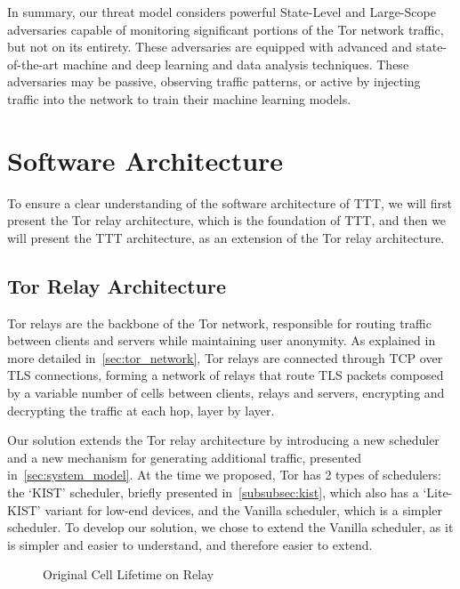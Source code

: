 In summary, our threat model considers powerful State-Level and Large-Scope adversaries capable of monitoring significant portions of the Tor network traffic, but not on its entirety. These adversaries are equipped with advanced and state-of-the-art machine and deep learning and data analysis techniques. These adversaries may be passive, observing traffic patterns, or active by injecting traffic into the network to train their machine learning models. 


\section{Software Architecture}\label{sec:software_architecture}

To ensure a clear understanding of the software architecture of TTT, we will first present the Tor relay architecture, which is the foundation of TTT, and then we will present the TTT architecture, as an extension of the Tor relay architecture.

\subsection{Tor Relay Architecture}\label{sec:tor_kist_architecture}
Tor relays are the backbone of the Tor network, responsible for routing traffic between clients and servers while maintaining user anonymity.  As explained in more detailed in~\autoref{sec:tor_network}, Tor relays are connected through TCP over TLS connections, forming a network of relays that route TLS packets composed by a variable number of cells between clients, relays and servers, encrypting and decrypting the traffic at each hop, layer by layer.

Our solution extends the Tor relay architecture by introducing a new scheduler and a new mechanism for generating additional traffic, presented in~\autoref{sec:system_model}. 
At the time we proposed, Tor has 2 types of schedulers: the `KIST' scheduler, briefly presented in~\autoref{subsubsec:kist}, which also has a `Lite-KIST' variant for low-end devices, and the Vanilla scheduler, which is a simpler scheduler. To develop our solution, we chose to extend the Vanilla scheduler, as it is simpler and easier to understand, and therefore easier to extend.

\begin{figure}[!h]
  \centering
  \caption{Original Cell Lifetime on Relay}\label{fig:tor_cell_lifetime}
\end{figure}

